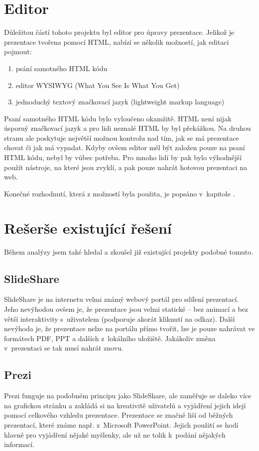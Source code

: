 \documentclass[11pt,twoside,a4paper]{book}
\begin{document}
\section{Editor}
Důležitou částí tohoto projektu byl editor pro úpravy prezentace. Jelikož je prezentace tvořena pomocí HTML, nabízí se
několik možností, jak editaci pojmout:

\begin{enumerate}
\item psání samotného HTML kódu
\item editor WYSIWYG (What You See Is What You Get)
\item jednoduchý textový značkovací jazyk (lightweight markup language)
\end{enumerate}

Psaní samotného HTML kódu bylo vyloučeno okamžitě. HTML není nijak úsporný značkovací jazyk a pro lidi neznalé HTML by
byl překážkou. Na druhou stranu ale poskytuje největší možnou kontrolu nad tím, jak se má prezentace chovat či jak má
vypadat. Kdyby ovšem editor měl být založen pouze na psaní HTML kódu, nebyl by vůbec potřeba. Pro mnoho lidí by pak bylo
výhodnější použít nástroje, na které jsou zvyklí, a pak pouze nahrát hotovou prezentaci na web.

Konečné rozhodnutí, která z možností byla použita, je popsáno v~kapitole .


\section{Rešerše existující řešení}
Během analýzy jsem také hledal a zkoušel již existující projekty podobné tomuto.

\subsection{SlideShare}
SlideShare je na internetu velmi známý webový portál pro sdílení prezentací. Jeho nevýhodou ovšem je, že
prezentace jsou velmi statické – bez animací a bez větší interaktivity s~uživatelem (podporuje akorát kliknutí na
odkaz). Další nevýhoda je, že prezentace nelze na portálu přímo tvořit, lze je pouze nahrávat ve formátech PDF, PPT a
dalších z~lokálního uložiště. Jakákoliv změna v~prezentaci se tak musí nahrát znovu.

\subsection{Prezi}
Prezi funguje na podobném principu jako SlideShare, ale zaměřuje se daleko více na grafickou stránku a zakládá si na
kreativitě uživatelů a vyjádření jejich idejí pomocí celkového vzhledu prezentace. Prezentace se značně liší od běžných
prezentací, které známe např. z~Microsoft PowerPoint. Jejich použití se hodí hlavně pro vyjádření nějaké myšlenky, ale už ne tolik k~podání nějakých informací.
\end{document}
